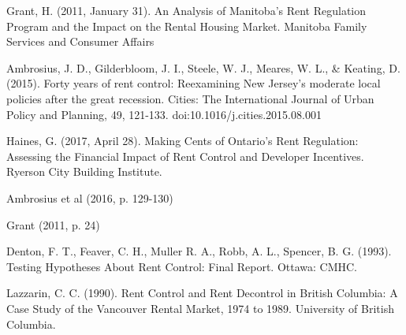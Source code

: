 \begin{thebibliography}{9}
  Grant, H. (2011, January 31). An Analysis of Manitoba’s Rent Regulation Program and the Impact on the Rental Housing Market. Manitoba Family Services and Consumer Affairs

   Ambrosius, J. D., Gilderbloom, J. I., Steele, W. J., Meares, W. L., \& Keating, D. (2015). Forty years of rent control: Reexamining New Jersey’s moderate local policies after the great recession. Cities: The International Journal of Urban Policy and Planning, 49, 121-133. doi:10.1016/j.cities.2015.08.001

  Haines, G. (2017, April 28). Making Cents of Ontario’s Rent Regulation: Assessing the Financial Impact of Rent Control and Developer Incentives. Ryerson City Building Institute.

  Ambrosius et al (2016, p. 129-130)

  Grant (2011, p. 24)

  Denton, F. T., Feaver, C. H., Muller R. A., Robb, A. L., Spencer, B. G. (1993). Testing Hypotheses About Rent Control: Final Report. Ottawa: CMHC.

  Lazzarin, C. C. (1990). Rent Control and Rent Decontrol in British Columbia: A Case Study of the Vancouver Rental Market, 1974 to 1989. University of British Columbia.

\end{thebibliography}

